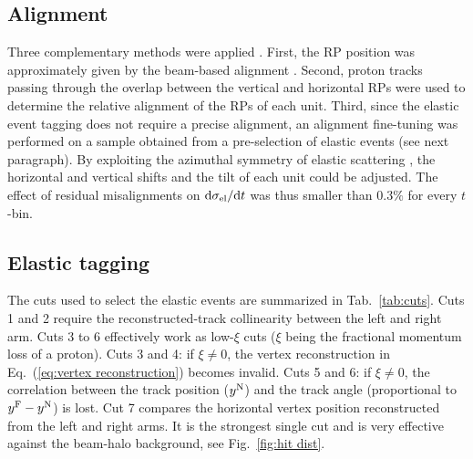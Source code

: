 \documentclass[doublecol]{epl/epl2}
\def\d{{\rm d}}
\begin{document}
\subsection{Alignment}

Three complementary methods were applied \cite{jan_thesis}. First, the RP position was approximately given by the beam-based alignment \cite{mario_ipac_2011}. Second, proton tracks passing through the overlap between the vertical and horizontal RPs were used to determine the relative alignment of the RPs of each unit. Third, since the elastic event tagging does not require a precise alignment, an alignment fine-tuning was performed on a sample obtained from a pre-selection of elastic events (see next paragraph). By exploiting the azimuthal symmetry of elastic scattering%
, the horizontal and vertical shifts and the tilt of each unit could be adjusted. The effect of residual misalignments on $\d\sigma_{\rm el}/\d t$ was thus smaller than $0.3\%$ for every $t$-bin.


\subsection{Elastic tagging}

The cuts used to select the elastic events are summarized in Tab.~\ref{tab:cuts}. Cuts 1 and 2 require the reconstructed-track collinearity between the left and right arm. Cuts 3 to 6 effectively work as low-$\xi$ cuts ($\xi$ being the fractional momentum loss of a proton).
Cuts 3 and 4: if $\xi\neq 0$, the vertex reconstruction in Eq.~(\ref{eq:vertex reconstruction}) becomes invalid.
Cuts 5 and 6: if $\xi\neq 0$, the correlation between the track position ($y^{\rm N}$) and the track angle (proportional to $y^{\rm F} - y^{\rm N}$) is lost. Cut 7 compares the horizontal vertex position reconstructed from the left and right arms. It is the strongest single cut and is very effective against the beam-halo background, see Fig.~\ref{fig:hit dist}.
\end{document}
